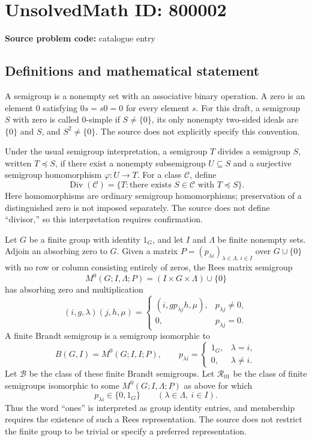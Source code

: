 \documentclass[11pt]{article}
\begin{document}
\section*{UnsolvedMath ID: 800002}
\textbf{Source problem code:} catalogue entry
\subsection{Definitions and mathematical statement}
A semigroup is a nonempty set with an associative binary operation. A zero is an element \(0\) satisfying \(0s=s0=0\) for every element \(s\). For this draft, a semigroup \(S\) with zero is called \(0\)-simple if \(S\ne\{0\}\), its only nonempty two-sided ideals are \(\{0\}\) and \(S\), and \(S^2\ne\{0\}\). The source does not explicitly specify this convention.

Under the usual semigroup interpretation, a semigroup \(T\) divides a semigroup \(S\), written \(T\preccurlyeq S\), if there exist a nonempty subsemigroup \(U\subseteq S\) and a surjective semigroup homomorphism \(\varphi:U\to T\). For a class \(\mathcal C\), define
\[
\operatorname{Div}(\mathcal C)=\{T:\text{there exists }S\in\mathcal C\text{ with }T\preccurlyeq S\}.
\]
Here homomorphisms are ordinary semigroup homomorphisms; preservation of a distinguished zero is not imposed separately. The source does not define ``divisor,'' so this interpretation requires confirmation.

Let \(G\) be a finite group with identity \(1_G\), and let \(I\) and \(\Lambda\) be finite nonempty sets. Adjoin an absorbing zero to \(G\). Given a matrix \(P=(p_{\lambda i})_{\lambda\in\Lambda,\,i\in I}\) over \(G\cup\{0\}\) with no row or column consisting entirely of zeros, the Rees matrix semigroup
\[
M^0(G;I,\Lambda;P)=(I\times G\times\Lambda)\cup\{0\}
\]
has absorbing zero and multiplication
\[
(i,g,\lambda)(j,h,\mu)=
\begin{cases}
(i,gp_{\lambda j}h,\mu),&p_{\lambda j}\ne0,\\
0,&p_{\lambda j}=0.
\end{cases}
\]
A finite Brandt semigroup is a semigroup isomorphic to
\[
B(G,I)=M^0(G;I,I;P),\qquad
p_{\lambda i}=\begin{cases}1_G,&\lambda=i,\\0,&\lambda\ne i.\end{cases}
\]
Let \(\mathcal B\) be the class of these finite Brandt semigroups. Let \(\mathcal R_{01}\) be the class of finite semigroups isomorphic to some \(M^0(G;I,\Lambda;P)\) as above for which
\[
p_{\lambda i}\in\{0,1_G\}\qquad(\lambda\in\Lambda,\ i\in I).
\]
Thus the word ``ones'' is interpreted as group identity entries, and membership requires the existence of such a Rees representation. The source does not restrict the finite group to be trivial or specify a preferred representation.
\end{document}

